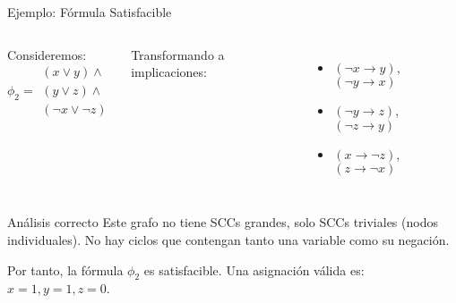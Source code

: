 \documentclass{beamer}
\begin{document}
\begin{frame}{Ejemplo: Fórmula Satisfacible}
\begin{columns}
Consideremos:
\vspace{-0.2cm}
$$\phi_2 = \begin{array}{l}
(x \lor y) \land \\
(y \lor z) \land \\
(\neg x \lor \neg z)
\end{array}$$

\vspace{0.2cm}
Transformando a implicaciones:
\vspace{-0.2cm}
\begin{itemize}
\item $(\neg x \rightarrow y)$, $(\neg y \rightarrow x)$
\item $(\neg y \rightarrow z)$, $(\neg z \rightarrow y)$
\item $(x \rightarrow \neg z)$, $(z \rightarrow \neg x)$
\end{itemize}

\vspace{-0.3cm}
\vspace{-0.5cm}
\end{columns}

\begin{block}{Análisis correcto}
Este grafo no tiene SCCs grandes, solo SCCs triviales (nodos individuales).
No hay ciclos que contengan tanto una variable como su negación.

Por tanto, la fórmula $\phi_2$ es satisfacible. Una asignación válida es: $x=1, y=1, z=0$.
\end{block}
\end{frame}
\end{document}
